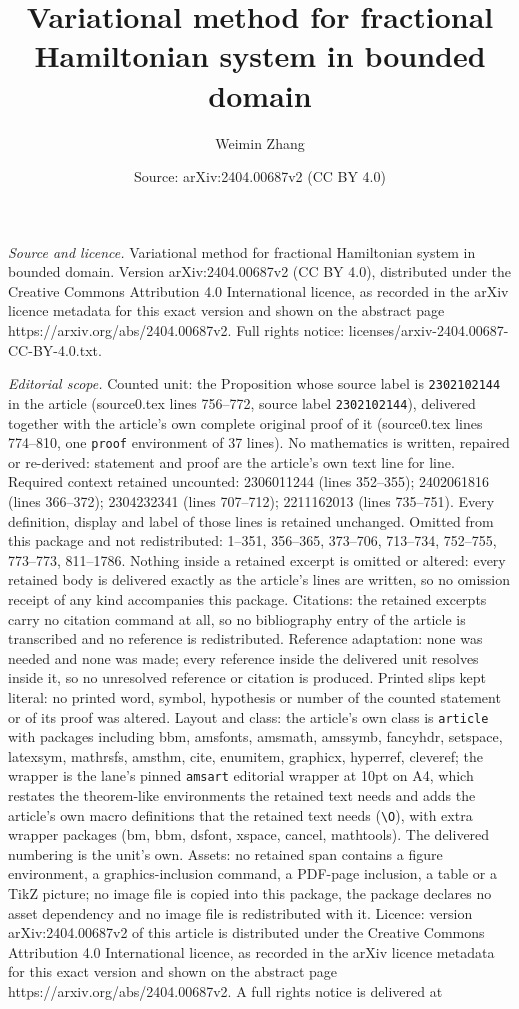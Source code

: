 \documentclass[10pt,a4paper]{amsart}
\title[Variational method for fractional Hamiltonian system in boun]{Variational method for fractional Hamiltonian system in bounded domain}
\author{Weimin Zhang}
\date{Source: arXiv:2404.00687v2 (CC BY 4.0)}
\begin{document}
\maketitle

\noindent\emph{Source and licence.} Variational method for fractional Hamiltonian system in bounded domain. Version arXiv:2404.00687v2 (CC BY 4.0), distributed under the Creative Commons Attribution 4.0 International licence, as recorded in the arXiv licence metadata for this exact version and shown on the abstract page https://arxiv.org/abs/2404.00687v2. Full rights notice: licenses/arxiv-2404.00687-CC-BY-4.0.txt.\par\smallskip

\noindent\textit{Editorial scope.} Counted unit: the Proposition whose source label is \texttt{2302102144} in the article (source0.tex lines 756--772, source label \texttt{2302102144}), delivered together with the article's own complete original proof of it (source0.tex lines 774--810, one \texttt{proof} environment of 37 lines). No mathematics is written, repaired or re-derived: statement and proof are the article's own text line for line. Required context retained uncounted: 2306011244 (lines 352--355); 2402061816 (lines 366--372); 2304232341 (lines 707--712); 2211162013 (lines 735--751). Every definition, display and label of those lines is retained unchanged. Omitted from this package and not redistributed: 1--351, 356--365, 373--706, 713--734, 752--755, 773--773, 811--1786. Nothing inside a retained excerpt is omitted or altered: every retained body is delivered exactly as the article's lines are written, so no omission receipt of any kind accompanies this package. Citations: the retained excerpts carry no citation command at all, so no bibliography entry of the article is transcribed and no reference is redistributed. Reference adaptation: none was needed and none was made; every reference inside the delivered unit resolves inside it, so no unresolved reference or citation is produced. Printed slips kept literal: no printed word, symbol, hypothesis or number of the counted statement or of its proof was altered. Layout and class: the article's own class is \texttt{article} with packages including bbm, amsfonts, amsmath, amssymb, fancyhdr, setspace, latexsym, mathrsfs, amsthm, cite, enumitem, graphicx, hyperref, cleveref; the wrapper is the lane's pinned \texttt{amsart} editorial wrapper at 10pt on A4, which restates the theorem-like environments the retained text needs and adds the article's own macro definitions that the retained text needs (\texttt{\textbackslash O}), with extra wrapper packages (bm, bbm, dsfont, xspace, cancel, mathtools). The delivered numbering is the unit's own. Assets: no retained span contains a figure environment, a graphics-inclusion command, a PDF-page inclusion, a table or a TikZ picture; no image file is copied into this package, the package declares no asset dependency and no image file is redistributed with it. Licence: version arXiv:2404.00687v2 of this article is distributed under the Creative Commons Attribution 4.0 International licence, as recorded in the arXiv licence metadata for this exact version and shown on the abstract page https://arxiv.org/abs/2404.00687v2. A full rights notice is delivered at 
\end{document}
